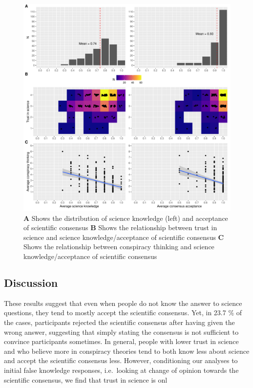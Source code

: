 \documentclass[
  doc,floatsintext]{apa6}
\begin{document}
\begin{figure}
\centering
\includegraphics{output/figures/exp1-plot.pdf}
\caption{\label{fig:exp1-plot}\textbf{A} Shows the distribution of science knowledge (left) and acceptance of scientific consensus \textbf{B} Shows the relationship between trust in science and science knowledge/acceptance of scientific consensus \textbf{C} Shows the relationship between conspiracy thinking and science knowledge/acceptance of scientific consensus}
\end{figure}

\hypertarget{discussion}{%
\subsection{Discussion}\label{discussion}}

These results suggest that even when people do not know the answer to science questions, they tend to mostly accept the scientific consensus. Yet, in 23.7 \% of the cases, participants rejected the scientific consensus after having given the wrong answer, suggesting that simply stating the consensus is not sufficient to convince participants sometimes. In general, people with lower trust in science and who believe more in conspiracy theories tend to both know less about science and accept the scientific consensus less. However, conditioning our analyses to initial false knowledge responses, i.e.~looking at change of opinion towards the scientific consensus, we find that trust in science is onl
\end{document}
